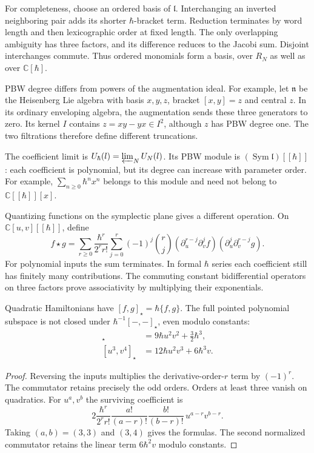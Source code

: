 For completeness, choose an ordered basis of $\mathfrak l$.
Interchanging an inverted neighboring pair adds its shorter
$\hbar$-bracket term. Reduction terminates by word length and then
lexicographic order at fixed length. The only overlapping
ambiguity has three factors, and its difference reduces to the
Jacobi sum. Disjoint interchanges commute.
Thus ordered monomials form a basis, over $R_N$ as well as over
$\mathbb C[\hbar]$.

PBW degree differs from powers of the augmentation ideal.
For example, let $\mathfrak n$ be the Heisenberg Lie algebra
with basis $x,y,z$, bracket $[x,y]=z$ and central $z$.
In its ordinary enveloping algebra, the augmentation sends these
three generators to zero. Its kernel $I$ contains
$z=xy-yx\in I^2$, although $z$ has PBW degree one.
The two filtrations therefore define different truncations.

The coefficient limit is
$U_\hbar(\mathfrak l)=\varprojlim_NU_N(\mathfrak l)$.
Its PBW module is $(\operatorname{Sym}\mathfrak l)[[\hbar]]$:
each coefficient is polynomial, but its degree can increase with
parameter order. For example, $\sum_{n\geq0}\hbar^n x^n$
belongs to this module and need not belong to
$\mathbb C[[\hbar]][x]$.

Quantizing functions on the symplectic plane gives a different
operation. On $\mathbb C[u,v][[\hbar]]$, define
\begin{equation}\label{mht:eq:ham-moyal}
 f\star g=
 \sum_{r\geq0}\frac{\hbar^r}{2^rr!}
 \sum_{j=0}^r(-1)^j\binom rj
  (\partial_u^{r-j}\partial_v^jf)
  (\partial_u^j\partial_v^{r-j}g).
\end{equation}
For polynomial inputs the sum terminates. In formal $\hbar$
series each coefficient still has finitely many contributions.
The commuting constant bidifferential operators on three factors
prove associativity by multiplying their exponentials.

\begin{proposition}\label{mht:prop:pointed-moyal-failure}
Quadratic Hamiltonians have
$[f,g]_\star=\hbar\{f,g\}$. The full pointed polynomial subspace
is not closed under $\hbar^{-1}[-,-]_\star$, even modulo constants:
\begin{align*}
 [u^3,v^3]_\star&=9\hbar u^2v^2+\frac32\hbar^3,\\
 [u^3,v^4]_\star&=12\hbar u^2v^3+6\hbar^3v.
\end{align*}
\end{proposition}

\begin{proof}
Reversing the inputs multiplies the derivative-order-$r$ term by
$(-1)^r$. The commutator retains precisely the odd orders.
Orders at least three vanish on quadratics. For $u^a,v^b$ the
surviving coefficient is
\[
 2\frac{\hbar^r}{2^rr!}
   \frac{a!}{(a-r)!}\frac{b!}{(b-r)!}\,u^{a-r}v^{b-r}.
\]
Taking $(a,b)=(3,3)$ and $(3,4)$ gives the formulas.
The second normalized commutator retains the linear term
$6\hbar^2v$ modulo constants.
\end{proof}

